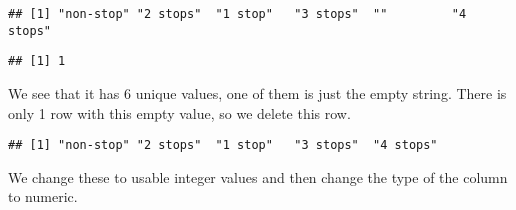 \documentclass[
]{article}
\newenvironment{Shaded}{\begin{snugshade}}{\end{snugshade}}
\newcommand{\DecValTok}[1]{\textcolor[rgb]{0.00,0.00,0.81}{#1}}
\newcommand{\FunctionTok}[1]{\textcolor[rgb]{0.00,0.00,0.00}{#1}}
\newcommand{\NormalTok}[1]{#1}
\newcommand{\OtherTok}[1]{\textcolor[rgb]{0.56,0.35,0.01}{#1}}
\newcommand{\SpecialCharTok}[1]{\textcolor[rgb]{0.00,0.00,0.00}{#1}}
\newcommand{\StringTok}[1]{\textcolor[rgb]{0.31,0.60,0.02}{#1}}
\begin{document}
\begin{verbatim}
## [1] "non-stop" "2 stops"  "1 stop"   "3 stops"  ""         "4 stops"
\end{verbatim}

\begin{Shaded}
\end{Shaded}

\begin{verbatim}
## [1] 1
\end{verbatim}

We see that it has 6 unique values, one of them is just the empty
string. There is only 1 row with this empty value, so we delete this
row.

\begin{Shaded}
\end{Shaded}

\begin{verbatim}
## [1] "non-stop" "2 stops"  "1 stop"   "3 stops"  "4 stops"
\end{verbatim}

We change these to usable integer values and then change the type of the
column to numeric.

\begin{Shaded}
\end{Shaded}
\end{document}
